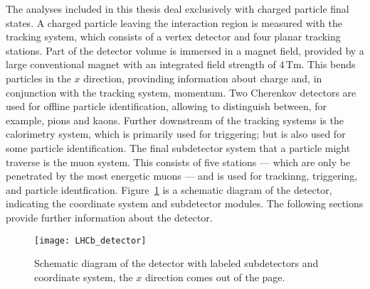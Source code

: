 
The analyses included in this thesis deal exclusively with charged particle final states.
A charged particle leaving the interaction region is measured with the tracking system, which
consists of a vertex detector and four planar tracking stations.
Part of the detector volume is immersed in a magnet field, provided by a large conventional magnet
with an integrated field strength of $4\,\mathrm{Tm}$.
This bends particles in the $x$ direction, provinding information about charge and, in conjunction
with the tracking system, momentum.
Two Cherenkov detectors are used for offline particle identification, allowing \lhcb to distinguish
between, for example, pions and kaons.
Further downstream of the tracking systems is the calorimetry system, which is primarily used for
triggering; but is also used for some particle identification.
The final subdetector system that a particle might traverse is the muon system.
This consists of five stations --- which are only be penetrated by the most energetic muons --- and
is used for trackinng, triggering, and particle identfication.
Figure~\ref{fig:lhcb:lhcb} is a schematic diagram of the \lhcb detector, indicating the coordinate
system and subdetector modules.
The following sections provide further information about the \lhcb detector.


\begin{figure}
  \begin{center}
    \texttt{[image: LHCb\_detector]}
  \end{center}
  \caption[\lhcb detector]
  {\small
    Schematic diagram of the \lhcb detector with labeled subdetectors and coordinate system, the
    $x$ direction comes out of the page.
  }
  \label{fig:lhcb:lhcb}
\end{figure}

